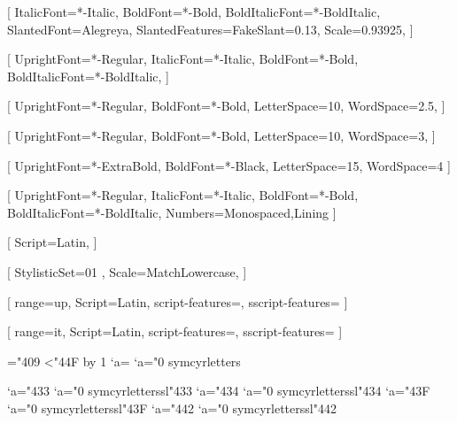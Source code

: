 
% 
%
\setmainfont{Alegreya}[
  ItalicFont=*-Italic,
  BoldFont=*-Bold,
  BoldItalicFont=*-BoldItalic,
  SlantedFont=Alegreya,
  SlantedFeatures={FakeSlant=0.13},
  Scale=0.93925,
]

\setsansfont{AlegreyaSans}[
  UprightFont=*-Regular,
  ItalicFont=*-Italic,
  BoldFont=*-Bold,
  BoldItalicFont=*-BoldItalic,
]

[
  UprightFont=*-Regular,
  BoldFont=*-Bold,
  LetterSpace=10,
  WordSpace=2.5,
]

[
  UprightFont=*-Regular,
  BoldFont=*-Bold,
  LetterSpace=10,
  WordSpace=3,
]

[
  UprightFont=*-ExtraBold,
  BoldFont=*-Black,
  LetterSpace=15,
  WordSpace=4
]

[
  UprightFont=*-Regular,
  ItalicFont=*-Italic,
  BoldFont=*-Bold,
  BoldItalicFont=*-BoldItalic,
  Numbers={Monospaced,Lining}
]

[
  Script=Latin,
]

% 
%

\usepackage{unicode-math}

[%
  StylisticSet=01 ,
  Scale=MatchLowercase,
]

[%
  range={up},
  Script=Latin,
  script-features={},
  sscript-features={}
]

[%
  range={it},
  Script=Latin,
  script-features={},
  sscript-features={}
]

\newcommand{\makecyrmathletter}[1]{%
  \begingroup\lccode`a=#1\lowercase{\endgroup
  \Umathcode`a}="0 \csname symcyrletters\endcsname\space #1
}
="409
\loop\ifnum{}<"44F
  \advance{} by 1
  \makecyrmathletter{\count255}
\repeat


\newcommand{\makecyrmathlettersl}[1]{%
  \begingroup\lccode`a=#1\lowercase{\endgroup
  \Umathcode`a}="0 \csname symcyrletterssl\endcsname\space #1
}
\makecyrmathlettersl{"433} %
\makecyrmathlettersl{"434} %
\makecyrmathlettersl{"43F} %
\makecyrmathlettersl{"442} %
